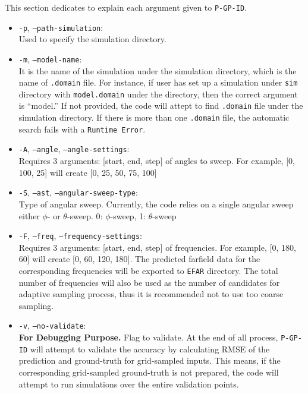 

\label{SEC:args}

This section dedicates to explain each argument given to \texttt{P-GP-ID}.

\begin{itemize}
  \itemsep 0ex
  \item \texttt{-p}, \texttt{--path-simulation}: 
  \\Used to specify the simulation directory.
  \item \texttt{-m}, \texttt{--model-name}: 
  \\It is the name of the simulation under the simulation directory, which is the name of \texttt{.domain} file. For instance, if user has set up a simulation under \texttt{sim} directory with \texttt{model.domain} under the directory, then the correct argument is ``model.'' If not provided, the code will attept to find \texttt{.domain} file under the simulation directory. If there is more than one \texttt{.domain} file, the automatic search fails with a \texttt{Runtime Error}.
  \item \texttt{-A}, \texttt{--angle}, \texttt{--angle-settings}: 
  \\Requires 3 arguments: [start, end, step] of angles to sweep. For example, [0, 100, 25] will create [0, 25, 50, 75, 100]
  \item \texttt{-S}, \texttt{--ast}, \texttt{--angular-sweep-type}: 
  \\Type of angular sweep. Currently, the code relies on a single angular sweep either $\phi$- or $\theta$-sweep. 0: $\phi$-sweep, 1: $\theta$-sweep
  \item \texttt{-F}, \texttt{--freq}, \texttt{--frequency-settings}: 
  \\Requires 3 arguments: [start, end, step] of frequencies. For example, [0, 180, 60] will create [0, 60, 120, 180]. The predicted farfield data for the corresponding frequencies will be exported to \texttt{EFAR} directory. The total number of frequencies will also be used as the number of candidates for adaptive sampling process, thus it is recommended not to use too coarse sampling.
  \item \texttt{-v}, \texttt{--no-validate}: 
  \\\textbf{For Debugging Purpose.} Flag to validate. At the end of all process, \texttt{P-GP-ID} will attempt to validate the accuracy by calculating RMSE of the prediction and ground-truth for grid-sampled inputs. This means, if the corresponding grid-sampled ground-truth is not prepared, the code will attempt to run simulations over the entire validation points.

\end{itemize}
